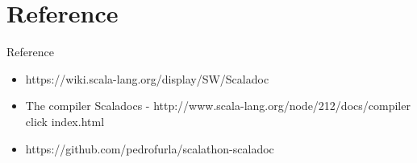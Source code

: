 \documentclass{beamer}
\begin{document}
\section{Reference}
\begin{frame}{Reference} 
	\begin{itemize}  
		\item https://wiki.scala-lang.org/display/SW/Scaladoc
		\item The compiler Scaladocs - http://www.scala-lang.org/node/212/docs/compiler click index.html
		\item https://github.com/pedrofurla/scalathon-scaladoc
	\end{itemize}
\end{frame}
\end{document}
